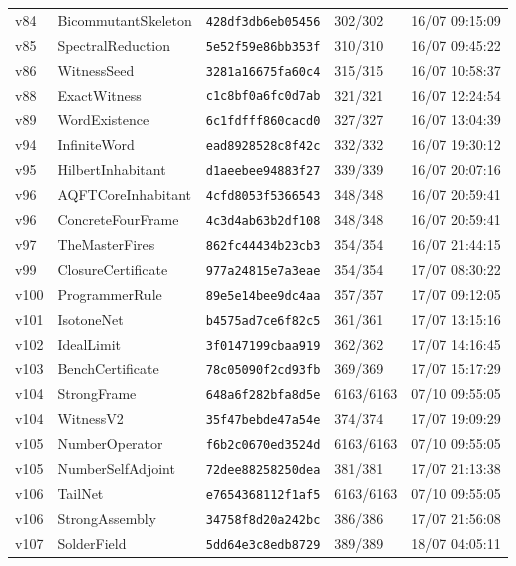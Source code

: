 \documentclass[11pt]{article}
\theoremstyle{definition}\newtheorem{deriv}{Derivação}
\begin{document}
{\begin{longtable}{@{}lllll@{}}
v84 & BicommutantSkeleton & \texttt{428df3db6eb05456} & 302/302 & 16/07 09:15:09 \\
v85 & SpectralReduction & \texttt{5e52f59e86bb353f} & 310/310 & 16/07 09:45:22 \\
v86 & WitnessSeed & \texttt{3281a16675fa60c4} & 315/315 & 16/07 10:58:37 \\
v88 & ExactWitness & \texttt{c1c8bf0a6fc0d7ab} & 321/321 & 16/07 12:24:54 \\
v89 & WordExistence & \texttt{6c1fdfff860cacd0} & 327/327 & 16/07 13:04:39 \\
v94 & InfiniteWord & \texttt{ead8928528c8f42c} & 332/332 & 16/07 19:30:12 \\
v95 & HilbertInhabitant & \texttt{d1aeebee94883f27} & 339/339 & 16/07 20:07:16 \\
v96 & AQFTCoreInhabitant & \texttt{4cfd8053f5366543} & 348/348 & 16/07 20:59:41 \\
v96 & ConcreteFourFrame & \texttt{4c3d4ab63b2df108} & 348/348 & 16/07 20:59:41 \\
v97 & TheMasterFires & \texttt{862fc44434b23cb3} & 354/354 & 16/07 21:44:15 \\
v99 & ClosureCertificate & \texttt{977a24815e7a3eae} & 354/354 & 17/07 08:30:22 \\
v100 & ProgrammerRule & \texttt{89e5e14bee9dc4aa} & 357/357 & 17/07 09:12:05 \\
v101 & IsotoneNet & \texttt{b4575ad7ce6f82c5} & 361/361 & 17/07 13:15:16 \\
v102 & IdealLimit & \texttt{3f0147199cbaa919} & 362/362 & 17/07 14:16:45 \\
v103 & BenchCertificate & \texttt{78c05090f2cd93fb} & 369/369 & 17/07 15:17:29 \\
v104 & StrongFrame & \texttt{648a6f282bfa8d5e} & 6163/6163 & 07/10 09:55:05 \\
v104 & WitnessV2 & \texttt{35f47bebde47a54e} & 374/374 & 17/07 19:09:29 \\
v105 & NumberOperator & \texttt{f6b2c0670ed3524d} & 6163/6163 & 07/10 09:55:05 \\
v105 & NumberSelfAdjoint & \texttt{72dee88258250dea} & 381/381 & 17/07 21:13:38 \\
v106 & TailNet & \texttt{e7654368112f1af5} & 6163/6163 & 07/10 09:55:05 \\
v106 & StrongAssembly & \texttt{34758f8d20a242bc} & 386/386 & 17/07 21:56:08 \\
v107 & SolderField & \texttt{5dd64e3c8edb8729} & 389/389 & 18/07 04:05:11 \\

\end{longtable}}
\end{document}
